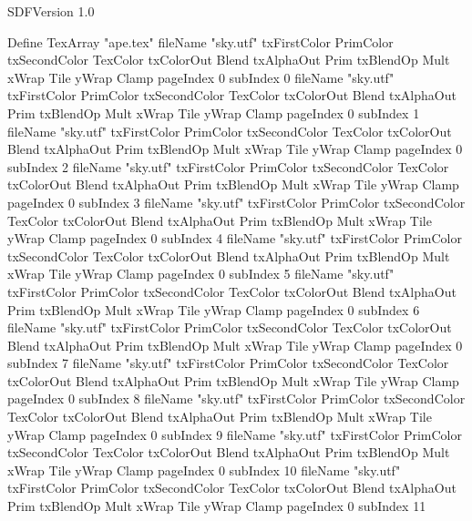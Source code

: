 SDFVersion 1.0

Define TexArray "ape.tex"{
	{
		fileName "sky.utf"
		txFirstColor PrimColor 
		txSecondColor TexColor 
		txColorOut Blend 
		txAlphaOut Prim 
		txBlendOp Mult 
		xWrap Tile  
		yWrap Clamp
		pageIndex 0
		subIndex 0
	}
	{
		fileName "sky.utf"
		txFirstColor PrimColor 
		txSecondColor TexColor 
		txColorOut Blend 
		txAlphaOut Prim 
		txBlendOp Mult 
		xWrap Tile  
		yWrap Clamp 
		pageIndex 0
		subIndex 1
	}
	{
		fileName "sky.utf"
		txFirstColor PrimColor 
		txSecondColor TexColor 
		txColorOut Blend 
		txAlphaOut Prim 
		txBlendOp Mult 
		xWrap Tile  
		yWrap Clamp
		pageIndex 0
		subIndex 2
	}
	{
		fileName "sky.utf"
		txFirstColor PrimColor 
		txSecondColor TexColor 
		txColorOut Blend 
		txAlphaOut Prim 
		txBlendOp Mult 
		xWrap Tile  
		yWrap Clamp 
		pageIndex 0
		subIndex 3
	}
	{
		fileName "sky.utf"
		txFirstColor PrimColor 
		txSecondColor TexColor 
		txColorOut Blend 
		txAlphaOut Prim 
		txBlendOp Mult 
		xWrap Tile  
		yWrap Clamp
		pageIndex 0
		subIndex 4
	}
	{
		fileName "sky.utf"
		txFirstColor PrimColor 
		txSecondColor TexColor 
		txColorOut Blend 
		txAlphaOut Prim 
		txBlendOp Mult 
		xWrap Tile  
		yWrap Clamp 
		pageIndex 0
		subIndex 5
	}
	{
		fileName "sky.utf"
		txFirstColor PrimColor 
		txSecondColor TexColor 
		txColorOut Blend 
		txAlphaOut Prim 
		txBlendOp Mult 
		xWrap Tile  
		yWrap Clamp
		pageIndex 0
		subIndex 6
	}
	{
		fileName "sky.utf"
		txFirstColor PrimColor 
		txSecondColor TexColor 
		txColorOut Blend 
		txAlphaOut Prim 
		txBlendOp Mult 
		xWrap Tile  
		yWrap Clamp 
		pageIndex 0
		subIndex 7
	}
	{
		fileName "sky.utf"
		txFirstColor PrimColor 
		txSecondColor TexColor 
		txColorOut Blend 
		txAlphaOut Prim 
		txBlendOp Mult 
		xWrap Tile  
		yWrap Clamp
		pageIndex 0
		subIndex 8
	}
	{
		fileName "sky.utf"
		txFirstColor PrimColor 
		txSecondColor TexColor 
		txColorOut Blend 
		txAlphaOut Prim 
		txBlendOp Mult 
		xWrap Tile  
		yWrap Clamp 
		pageIndex 0
		subIndex 9
	}
	{
		fileName "sky.utf"
		txFirstColor PrimColor 
		txSecondColor TexColor 
		txColorOut Blend 
		txAlphaOut Prim 
		txBlendOp Mult 
		xWrap Tile  
		yWrap Clamp
		pageIndex 0
		subIndex 10
	}
	{
		fileName "sky.utf"
		txFirstColor PrimColor 
		txSecondColor TexColor 
		txColorOut Blend 
		txAlphaOut Prim 
		txBlendOp Mult 
		xWrap Tile  
		yWrap Clamp 
		pageIndex 0
		subIndex 11
	}
}




